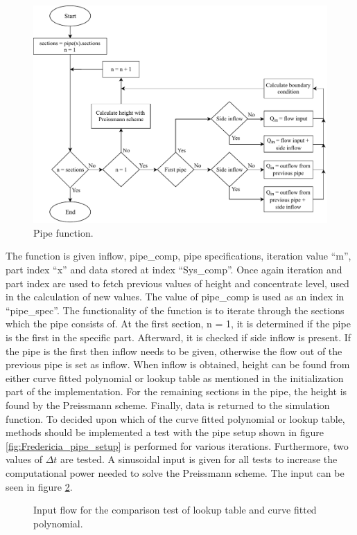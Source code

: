\begin{figure}[H]
\centering
\includegraphics[width=0.9 \textwidth]{report/simulation/pictures/pipe_function.pdf}
\caption{Pipe function.}
\label{fig:pipe_function}
\end{figure}

The function is given inflow, pipe\_comp, pipe specifications, iteration value ``m'', part index ``x'' and data stored at index ``Sys\_comp''.
Once again iteration and part index are used to fetch previous values of height and concentrate level, used in the calculation of new values. The value of pipe\_comp is used as an index in ``pipe\_spec''. The functionality of the function is to iterate through the sections which the pipe consists of.
At the first section, n = 1, it is determined if the pipe is the first in the specific part. Afterward, it is checked if side inflow is present. If the pipe is the first then inflow needs to be given, otherwise the flow out of the previous pipe is set as inflow. When inflow is obtained, height can be found from either curve fitted polynomial or lookup table as mentioned in the initialization part of the implementation. For the remaining sections in the pipe, the height is found by the Preissmann scheme. Finally, data is returned to the simulation function.
To decided upon which of the curve fitted polynomial or lookup table, methods should be implemented a test with the pipe setup shown in figure \ref{fig:Fredericia_pipe_setup} is performed for various iterations. Furthermore, two values of $\Delta t$ are tested. A  sinusoidal input is given for all tests to increase the computational power needed to solve the Preissmann scheme. The input can be seen in figure \ref{fig:comparison_look_fit_input}.
\begin{figure}[H]
 \centering
 
\caption{Input flow for the comparison test of lookup table and curve fitted polynomial.}
\label{fig:comparison_look_fit_input}
\end{figure} 

